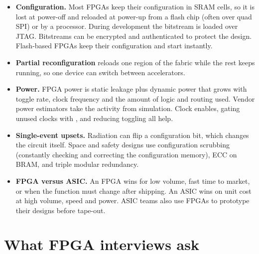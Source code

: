 \begin{itemize}
  \item \textbf{Configuration.} Most FPGAs keep their configuration in SRAM cells, so it is lost at power-off and reloaded at power-up from a flash chip (often over quad SPI) or by a processor. During development the bitstream is loaded over JTAG. Bitstreams can be encrypted and authenticated to protect the design. Flash-based FPGAs keep their configuration and start instantly.
  \item \textbf{Partial reconfiguration} reloads one region of the fabric while the rest keeps running, so one device can switch between accelerators.
  \item \textbf{Power.} FPGA power is static leakage plus dynamic power that grows with toggle rate, clock frequency and the amount of logic and routing used. Vendor power estimators take the activity from simulation. Clock enables, gating unused clocks with , and reducing toggling all help.
  \item \textbf{Single-event upsets.} Radiation can flip a configuration bit, which changes the circuit itself. Space and safety designs use configuration scrubbing (constantly checking and correcting the configuration memory), ECC on BRAM, and triple modular redundancy.
  \item \textbf{FPGA versus ASIC.} An FPGA wins for low volume, fast time to market, or when the function must change after shipping. An ASIC wins on unit cost at high volume, speed and power. ASIC teams also use FPGAs to prototype their designs before tape-out.
\end{itemize}

\section{What FPGA interviews ask}

